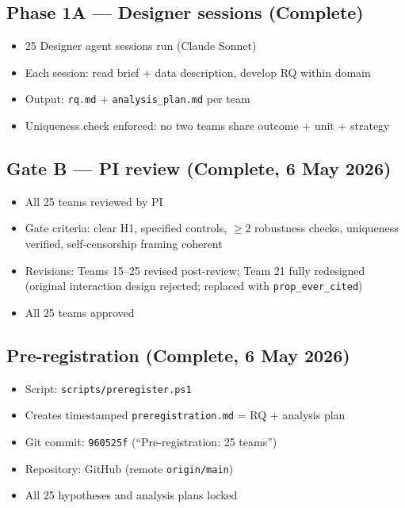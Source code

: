 \documentclass[12pt,a4paper]{article}
\begin{document}
\subsection*{Phase 1A --- Designer sessions (Complete)}

\begin{itemize}
  \item 25 Designer agent sessions run (Claude Sonnet)
  \item Each session: read brief + data description, develop RQ within domain
  \item Output: \texttt{rq.md} + \texttt{analysis\_plan.md} per team
  \item Uniqueness check enforced: no two teams share outcome + unit + strategy
\end{itemize}

\subsection*{Gate B --- PI review (Complete, 6 May 2026)}

\begin{itemize}
  \item All 25 teams reviewed by PI
  \item Gate criteria: clear H1, specified controls, $\geq 2$ robustness checks,
    uniqueness verified, self-censorship framing coherent
  \item Revisions: Teams 15--25 revised post-review; Team 21 fully redesigned
    (original interaction design rejected; replaced with \texttt{prop\_ever\_cited})
  \item All 25 teams approved
\end{itemize}

\subsection*{Pre-registration (Complete, 6 May 2026)}

\begin{itemize}
  \item Script: \texttt{scripts/preregister.ps1}
  \item Creates timestamped \texttt{preregistration.md} = RQ + analysis plan
  \item Git commit: \texttt{960525f} (``Pre-registration: 25 teams'')
  \item Repository: GitHub (remote \texttt{origin/main})
  \item All 25 hypotheses and analysis plans locked
\end{itemize}
\end{document}
